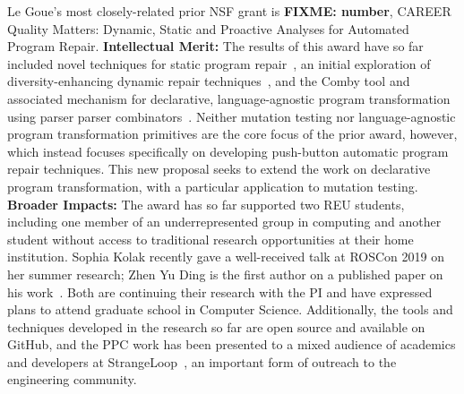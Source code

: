 Le Goue's most closely-related prior NSF grant is \textbf{FIXME: number}, CAREER
Quality Matters: Dynamic, Static and Proactive Analyses for Automated Program
Repair.  \textbf{Intellectual Merit:} The results of this award have so far
included novel techniques for static program repair~\cite{footpatch}, an initial
exploration of diversity-enhancing dynamic repair
techniques~\cite{undergrads-gi}, and the Comby tool and associated mechanism for
declarative, language-agnostic program transformation using parser parser
combinators~\cite{rvt-ppc}.  Neither mutation testing nor language-agnostic
program transformation primitives are the core focus of the prior award,
however, which instead focuses specifically on developing push-button automatic
program repair techniques. This new proposal seeks to extend the work on
declarative program transformation, with a particular application to mutation
testing. \textbf{Broader Impacts:} The award has so far supported two REU
students, including one member of an underrepresented group in computing and
another student without access to traditional research opportunities at their
home institution.  Sophia Kolak recently gave a well-received talk at ROSCon
2019 on her summer research; Zhen Yu Ding is the first author on a published
paper on his work~\cite{gi-undergrads}.  Both are continuing their research with
the PI and have expressed plans to attend graduate school in Computer Science.
Additionally, the tools and techniques developed in the research so far are open
source and available on GitHub, and the PPC work has been presented to a mixed
audience of academics and developers at StrangeLoop~\cite{strangeloop}, an
important form of outreach to the engineering community.
